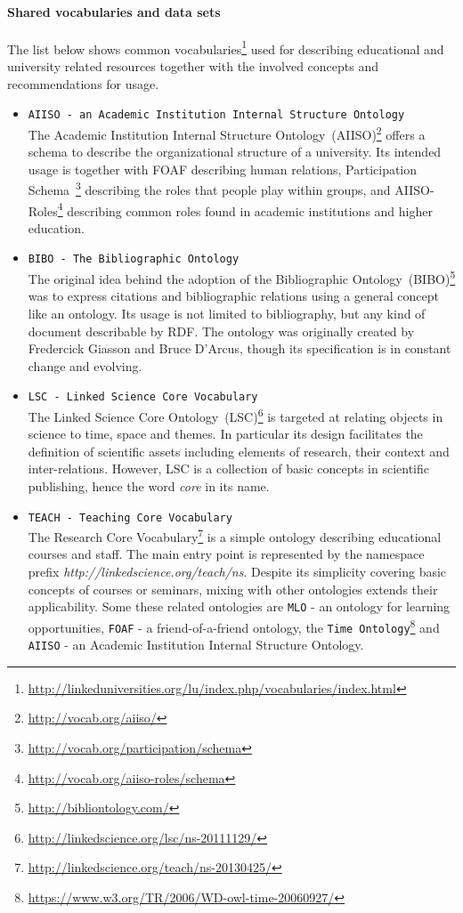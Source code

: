 \documentclass{article}
\begin{document}
\paragraph{Shared vocabularies and data sets}
The list below shows common vocabularies\footnote{\url{http://linkeduniversities.org/lu/index.php/vocabularies/index.html}} used for describing educational and university related resources together
with the involved concepts and recommendations for usage. 
\begin{itemize}
	\item \texttt{AIISO - an Academic Institution Internal Structure Ontology}~\\
	The Academic Institution Internal Structure Ontology~(AIISO)\footnote{\url{http://vocab.org/aiiso/}} offers a schema to describe the organizational structure of a university. Its intended usage is together with
	FOAF describing human relations, Participation Schema~\footnote{\url{http://vocab.org/participation/schema}} describing the roles that people play within groups, and AIISO-Roles\footnote{\url{http://vocab.org/aiiso-roles/schema}} describing common roles found in academic institutions and higher education. 
	\item \texttt{BIBO - The Bibliographic Ontology}~\\
	The original idea behind the adoption of the Bibliographic Ontology~(BIBO)\footnote{\url{http://bibliontology.com/}} was to express citations and bibliographic relations using a general concept like an ontology. Its usage is not limited to bibliography, but any kind of document describable by RDF. The ontology was originally created by Fredercick Giasson and Bruce D'Arcus, though its specification is in constant change and evolving. 
	\item \texttt{LSC - Linked Science Core Vocabulary}~\\
	The Linked Science Core Ontology~(LSC)\footnote{\url{http://linkedscience.org/lsc/ns-20111129/}} is targeted at relating objects in science to time, space and themes. In particular its design facilitates the definition of scientific assets including elements of research, their context and inter-relations. However, LSC is a collection of basic concepts in scientific publishing, hence the word \textit{core} in its name.  
	\item \texttt{TEACH - Teaching Core Vocabulary}~\\
	The Research Core Vocabulary\footnote{\url{http://linkedscience.org/teach/ns-20130425/}} is a simple ontology describing educational courses and staff.
	The main entry point is represented by the namespace prefix \textit{http://linkedscience.org/teach/ns}.
	Despite its simplicity covering basic concepts of courses or seminars, mixing with other ontologies 
	extends their applicability. Some these related ontologies are \texttt{MLO} - an ontology for learning opportunities, 
	\texttt{FOAF} - a friend-of-a-friend ontology, the \texttt{Time Ontology}\footnote{\url{https://www.w3.org/TR/2006/WD-owl-time-20060927/}} and
	\texttt{AIISO} - an Academic Institution Internal Structure Ontology. 
\end{itemize}
\end{document}
